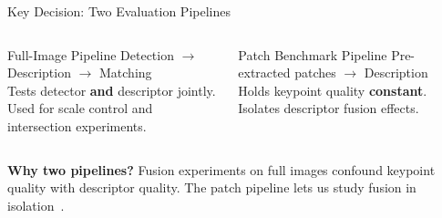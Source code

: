 \documentclass[aspectratio=169, 12pt]{beamer}
\begin{document}
\begin{frame}{Key Decision: Two Evaluation Pipelines}
  \begin{columns}[T]
    \begin{block}{Full-Image Pipeline}
      Detection $\to$ Description $\to$ Matching\\[0.5em]
      {\small Tests detector \textbf{and} descriptor jointly.\\
      Used for scale control and intersection experiments.}
    \end{block}
    \begin{block}{Patch Benchmark Pipeline}
      Pre-extracted patches $\to$ Description\\[0.5em]
      {\small Holds keypoint quality \textbf{constant}.\\
      Isolates descriptor fusion effects.}
    \end{block}
  \end{columns}
  \vfill
  \textbf{Why two pipelines?} Fusion experiments on full images confound keypoint quality with descriptor quality. The patch pipeline lets us study fusion in isolation~\cite{balntas2017hpatches}.
\end{frame}
\end{document}
